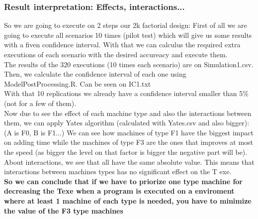 \documentclass[12pt]{article}
\begin{document}
\subsubsection{Result interpretation: Effects, interactions...}
So we are going to execute on 2 steps our 2k factorial design: First of all we are going to execute all scenarios 10 times (pilot test) which will give us some results with a fiven confidence interval. With that we can calculus the required extra executions of each scenario with the desired accureacy and execute them.\\
The results of the 320 executions (10 times each scenario) are on Simulation1.csv.
Then, we calculate the confidence interval of each one using ModelPostProcessing.R. Can be seen on IC1.txt\\
With that 10 replications we already have a confidence interval smaller than 5\% (not for a few of them).\\

Now due to see the effect of each machine type and also the interactions between them, we can apply Yates algorithm (calculated with Yates.csv and also bigger):
(A is F0, B is F1...)
We can see how machines of type F1 have the biggest impact on adding time while the machines of type F3 are the ones that improves at most the speed (as bigger the level on that factor is bigger the negative part will be).\\
About interactions, we see that all have the same absolute value. This means that interactions between machines types has no significant effect on the T exe.\\
\textbf{So we can conclude that if we have to priorize one type machine for decreasing the Texe when a program is executed on a enviroment where at least 1 machine of each type is needed, you have to minimize the value of the F3 type machines}
\end{document}

